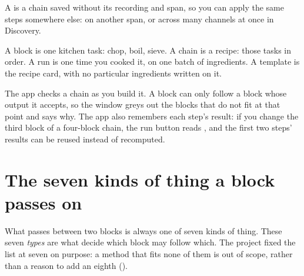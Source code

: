 A  is a chain saved without its recording and span, so you can
apply the same steps somewhere else: on another span, or across many channels at once in
Discovery.

\begin{plainterms}
A block is one kitchen task: chop, boil, sieve. A chain is a recipe: those tasks in order. A
run is one time you cooked it, on one batch of ingredients. A template is the recipe card,
with no particular ingredients written on it.
\end{plainterms}

The app checks a chain as you build it. A block can only follow a block whose output it
accepts, so the  window greys out the blocks that do not fit at that point
and says why. The app also remembers each step's result: if you change the third block of a
four-block chain, the run button reads , and the first two steps' results
can be reused instead of recomputed.

\section{The seven kinds of thing a block passes on}\label{sec:core-ideas-types}
What passes between two blocks is always one of seven kinds of thing. These seven
\emph{types} are what decide which block may follow which. The project fixed the list at
seven on purpose: a method that fits none of them is out of scope, rather than a reason to
add an eighth ().

